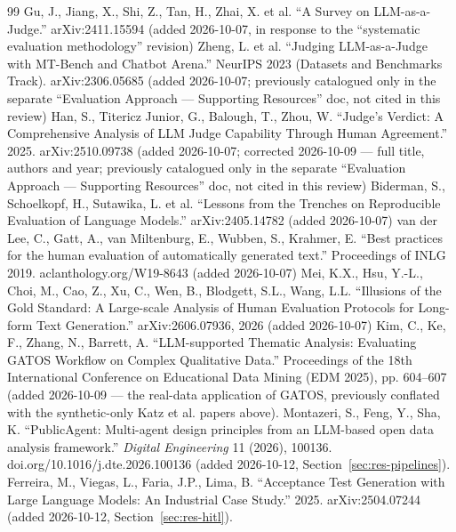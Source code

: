 \begin{thebibliography}{99}
 Gu, J., Jiang, X., Shi, Z., Tan, H., Zhai, X. et al. \textquotedblleft{}A Survey on LLM-as-a-Judge.\textquotedblright{} arXiv:2411.15594 (added 2026-10-07, in response to the \textquotedblleft{}systematic evaluation methodology\textquotedblright{} revision)
 Zheng, L. et al. \textquotedblleft{}Judging LLM-as-a-Judge with MT-Bench and Chatbot Arena.\textquotedblright{} NeurIPS 2023 (Datasets and Benchmarks Track). arXiv:2306.05685 (added 2026-10-07; previously catalogued only in the separate \textquotedblleft{}Evaluation Approach — Supporting Resources\textquotedblright{} doc, not cited in this review)
 Han, S., Titericz Junior, G., Balough, T., Zhou, W. \textquotedblleft{}Judge's Verdict: A Comprehensive Analysis of LLM Judge Capability Through Human Agreement.\textquotedblright{} 2025. arXiv:2510.09738 (added 2026-10-07; corrected 2026-10-09 — full title, authors and year; previously catalogued only in the separate \textquotedblleft{}Evaluation Approach — Supporting Resources\textquotedblright{} doc, not cited in this review)
 Biderman, S., Schoelkopf, H., Sutawika, L. et al. \textquotedblleft{}Lessons from the Trenches on Reproducible Evaluation of Language Models.\textquotedblright{} arXiv:2405.14782 (added 2026-10-07)
 van der Lee, C., Gatt, A., van Miltenburg, E., Wubben, S., Krahmer, E. \textquotedblleft{}Best practices for the human evaluation of automatically generated text.\textquotedblright{} Proceedings of INLG 2019. aclanthology.org/W19-8643 (added 2026-10-07)
 Mei, K.X., Hsu, Y.-L., Choi, M., Cao, Z., Xu, C., Wen, B., Blodgett, S.L., Wang, L.L. \textquotedblleft{}Illusions of the Gold Standard: A Large-scale Analysis of Human Evaluation Protocols for Long-form Text Generation.\textquotedblright{} arXiv:2606.07936, 2026 (added 2026-10-07)
 Kim, C., Ke, F., Zhang, N., Barrett, A. \textquotedblleft{}LLM-supported Thematic Analysis: Evaluating GATOS Workflow on Complex Qualitative Data.\textquotedblright{} Proceedings of the 18th International Conference on Educational Data Mining (EDM 2025), pp. 604–607 (added 2026-10-09 — the real-data application of GATOS, previously conflated with the synthetic-only Katz et al. papers above).
 Montazeri, S., Feng, Y., Sha, K. \textquotedblleft{}PublicAgent: Multi-agent design principles from an LLM-based open data analysis framework.\textquotedblright{} \textit{Digital Engineering} 11 (2026), 100136. doi.org/10.1016/j.dte.2026.100136 (added 2026-10-12, Section~\ref{sec:res-pipelines}).
 Ferreira, M., Viegas, L., Faria, J.P., Lima, B. \textquotedblleft{}Acceptance Test Generation with Large Language Models: An Industrial Case Study.\textquotedblright{} 2025. arXiv:2504.07244 (added 2026-10-12, Section~\ref{sec:res-hitl}).

\end{thebibliography}
